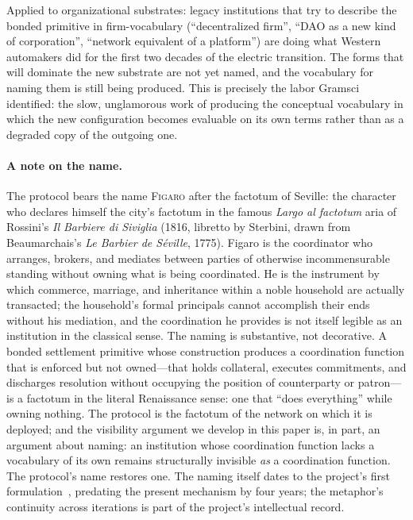 \documentclass[11pt,a4paper]{article}
\theoremstyle{remark}
\newcommand{\figaro}{\textsc{Figaro}}
\begin{document}
Applied to organizational substrates: legacy institutions that try
to describe the bonded primitive in firm-vocabulary (``decentralized
firm'', ``DAO as a new kind of corporation'', ``network equivalent
of a platform'') are doing what Western automakers did for the
first two decades of the electric transition. The forms that will
dominate the new substrate are not yet named, and the vocabulary
for naming them is still being produced. This is precisely the
labor Gramsci identified: the slow, unglamorous work of producing
the conceptual vocabulary in which the new configuration becomes
evaluable on its own terms rather than as a degraded copy of the
outgoing one.

\paragraph{A note on the name.}
The protocol bears the name \figaro{} after the factotum of
Seville: the character who declares himself the city's factotum
in the famous \emph{Largo al factotum} aria of Rossini's
\emph{Il Barbiere di Siviglia} (1816, libretto by Sterbini, drawn
from Beaumarchais's \emph{Le Barbier de Séville}, 1775). Figaro is
the coordinator who arranges, brokers, and mediates between parties
of otherwise incommensurable standing without owning what is being
coordinated. He is the instrument by which commerce, marriage, and
inheritance within a noble household are actually transacted; the
household's formal principals cannot accomplish their ends without
his mediation, and the coordination he provides is not itself
legible as an institution in the classical sense. The naming is
substantive, not decorative. A bonded settlement primitive whose
construction produces a coordination function that is
enforced but not owned---that holds collateral, executes
commitments, and discharges resolution without occupying the
position of counterparty or patron---is a factotum in the literal
Renaissance sense: one that ``does everything'' while owning
nothing. The protocol is the factotum of the network on which it is
deployed; and the visibility argument we develop in this paper is,
in part, an argument about naming: an institution whose coordination
function lacks a vocabulary of its own remains structurally
invisible \emph{as} a coordination function. The protocol's name
restores one. The naming itself dates to the project's first
formulation~\citep{genovese_daliana_2022}, predating the present
mechanism by four years; the metaphor's continuity across
iterations is part of the project's intellectual record.
\end{document}
